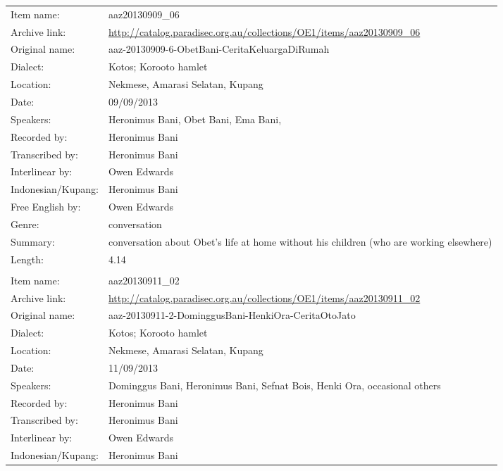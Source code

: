\begin{longtable}{lL{.67\textwidth}}
Item name:			& aaz20130909{\_}06\\
Archive link:			& \url{http://catalog.paradisec.org.au/collections/OE1/items/aaz20130909_06}\\
Original name:			& aaz-20130909-6-ObetBani-CeritaKeluargaDiRumah\\
Dialect:				& Kotos; Koro{\Q}oto hamlet \\
Location:				& Nekmese{\Q}, Amarasi Selatan, Kupang \\
Date:				& 09/09/2013\\
Speakers:				& Heronimus Bani, Obet Bani, Ema Bani, \\
Recorded by:			& Heronimus Bani\\
Transcribed by:		& Heronimus Bani\\
Interlinear by:		& Owen Edwards \\
Indonesian/Kupang:		& Heronimus Bani\\
Free English by:		& Owen Edwards\\
Genre:				& conversation\\
Summary:				& conversation about Obet's life at home without his children (who are working elsewhere)\\
Length:				& 4.14\\ \lspbottomrule
{}			& \\
Item name:			& aaz20130911{\_}02\\
Archive link:			& \url{http://catalog.paradisec.org.au/collections/OE1/items/aaz20130911_02}\\
Original name:			& {\small aaz-20130911-2-DominggusBani-HenkiOra-CeritaOtoJato}\\
Dialect:				& Kotos; Koro{\Q}oto hamlet \\
Location:				& Nekmese{\Q}, Amarasi Selatan, Kupang \\
Date:				& 11/09/2013\\
Speakers:				& Dominggus Bani, Heronimus Bani, Sefnat Bois, Henki Ora, occasional others\\
Recorded by:			& Heronimus Bani\\
Transcribed by:		& Heronimus Bani\\
Interlinear by:		& Owen Edwards \\
Indonesian/Kupang:		& Heronimus Bani\\

\end{longtable}
